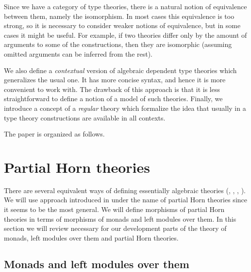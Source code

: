 \documentclass[reqno]{amsart}
\theoremstyle{definition}
\theoremstyle{remark}
\numberwithin{figure}{section}
\begin{document}
Since we have a category of type theories, there is a natural notion of equivalence between them, namely the isomorphism.
In most cases this equivalence is too strong, so it is necessary to consider weaker notions of equivalence, but in some cases it might be useful.
For example, if two theories differ only by the amount of arguments to some of the constructions,
then they are isomorphic (assuming omitted arguments can be inferred from the rest).

We also define a \emph{contextual} version of algebraic dependent type theories which generalizes the usual one.
It has more concise syntax, and hence it is more convenient to work with.
The drawback of this approach is that it is less straightforward to define a notion of a model of such theories.
Finally, we introduce a concept of a \emph{regular} theory which formalize the idea that usually in a type theory constructions are available in all contexts.

The paper is organized as follows.

\section{Partial Horn theories}
\label{sec:PHT}

There are several equivalent ways of defining essentially algebraic theories (\cite{LPC}, \cite{GAT}, \cite{PHL}, \cite[D 1.3.4]{elephant}).
We will use approach introduced in \cite{PHL} under the name of partial Horn theories since it seems to be the most general.
We will define morphisms of partial Horn theories in terms of morphisms of monads and left modules over them.
In this section we will review necessary for our development parts of the theory of monads, left modules over them and partial Horn theories.

\subsection{Monads and left modules over them}
\end{document}
